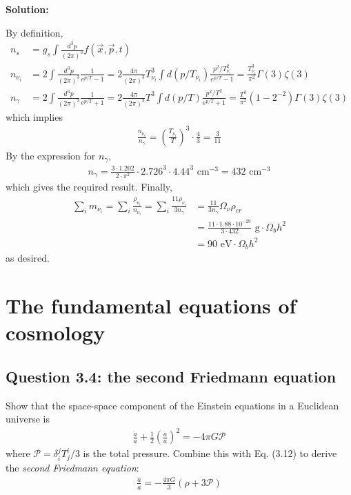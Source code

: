 \documentclass[11pt]{article}
\begin{document}
\textbf{Solution:}

By definition, 
\begin{align*}
    n_s &= g_s \int \frac{d^3 p}{(2\pi)^3} f(\vec{x}, \vec{p}, t) \\
    n_{\nu_i}&= 2 \int \frac{d^3 p }{(2\pi)^3} \frac{1}{e^{p/T} - 1} = 2 \frac{4\pi }{(2\pi)^3} T^3_{\nu_i}\int d(p/T_{\nu_i}) \frac{p^2/T^2_{\nu_i}}{e^{p/T} - 1} = \frac{T_{\nu_i}^3}{\pi^2} \Gamma(3) \zeta(3) \\
    n_\gamma &= 2 \int \frac{d^3 p}{(2\pi)^3} \frac{1}{e^{p/T} + 1} = 2 \frac{4\pi}{(2\pi)^2} T^3 \int d(p/T) \frac{p^2/T^2}{e^{p/T} + 1 } = \frac{T^3}{\pi^2} (1- 2^{-2})\Gamma(3) \zeta(3)
\end{align*}
which implies 
\begin{align*}
    \frac{n_{\nu_i}}{n_\gamma} = \left(\frac{T_{\nu_i}}{T} \right)^3 \cdot \frac{4}{3} = \frac{3}{11}
\end{align*}
By the expression for $n_{\gamma}$, 
\begin{align*}
    n_{\gamma} = \frac{3 \cdot 1.202}{2 \cdot \pi^2} \cdot 2.726^3 \cdot 4.44^3 \text{ cm}^{-3} = 432 \text{ cm}^{-3}
\end{align*}
which gives the required result. Finally, 
\begin{align*}
    \sum_i m_{\nu_i} = \sum_i \frac{\rho_{\nu_i}}{n_{\nu_i}} = \sum_i \frac{11\rho_{\nu_i}}{3 n_\gamma} &= \frac{11}{3n_\gamma} \Omega_\nu \rho_{cr} \\
    &= \frac{11\cdot 1.88 \cdot 10^{-29}}{3 \cdot 432} \text{ g} \cdot \Omega_b h^2 \\
    &= 90 \text{ eV} \cdot \Omega_b h^2
\end{align*}
as desired. 

\newpage
\section{The fundamental equations of cosmology}
\subsection{Question 3.4: the second Friedmann equation}
Show that the space-space component of the Einstein equations in a Euclidean universe is 
\begin{align*}
    \frac{\ddot{a}}{a} + \frac{1}{2}\left(\frac{\dot{a}}{a}\right)^2 = - 4 \pi G \mathcal{P}
\end{align*}
where $\mathcal{P} = \delta^j_i T^i_j/3$ is the total pressure. Combine this with Eq. (3.12) to derive the \textit{second Friedmann equation}:
\begin{align*}
    \frac{\ddot{a}}{a} = -\frac{4\pi G}{3}(\rho + 3 \mathcal{P})
\end{align*}
\end{document}
